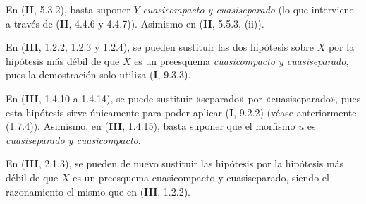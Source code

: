 \begin{env}[1.7.19]
\label{IV.1.7.19-fr}
En (\textbf{II}, 5.3.2), basta suponer $Y$ \emph{cuasicompacto y
cuasiseparado} (lo que interviene a través de (\textbf{II}, 4.4.6 y 4.4.7)). Asimismo en (\textbf{II},
5.5.3, (ii)).
\end{env}

\begin{env}[1.7.20]
\label{IV.1.7.20-fr}
En (\textbf{III}, 1.2.2, 1.2.3 y 1.2.4), se pueden sustituir las dos hipótesis sobre
$X$ por la hipótesis más débil de que $X$ es un preesquema \emph{cuasicompacto
y cuasiseparado}, pues la demostración solo utiliza (\textbf{I}, 9.3.3).
\end{env}

\begin{env}[1.7.21]
\label{IV.1.7.21-fr}
En (\textbf{III}, 1.4.10 a 1.4.14), se puede sustituir «separado» por
«cuasiseparado», pues esta hipótesis sirve únicamente para poder aplicar (\textbf{I},
9.2.2) (véase anteriormente (1.7.4)). Asimismo, en (\textbf{III}, 1.4.15), basta
suponer que el morfismo $u$ es \emph{cuasiseparado y cuasicompacto}.
\end{env}

\begin{env}[1.7.22]
\label{IV.1.7.22-fr}
En (\textbf{III}, 2.1.3), se pueden de nuevo sustituir las hipótesis por la hipótesis
más débil de que $X$ es un preesquema cuasicompacto y cuasiseparado, siendo el
razonamiento el mismo que en (\textbf{III}, 1.2.2).
\end{env}

